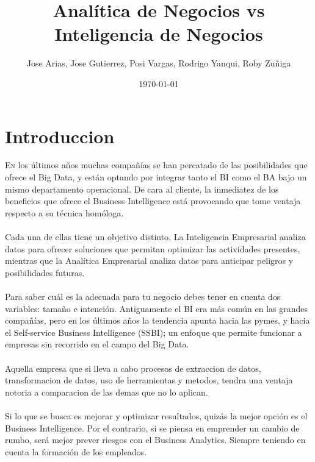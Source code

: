 \documentclass[twoside,twocolumn]{article}
\title{Analítica de Negocios vs Inteligencia de Negocios}
\author{Jose Arias, Jose Gutierrez, Posi Vargas, Rodrigo Yanqui, Roby Zuñiga}
\date{\today}
\begin{document}
\maketitle


\section{Introduccion}
\lettrine[nindent=0em,lines=3]{E}n los últimos años muchas compañías se han percatado de las posibilidades que ofrece el Big Data, y están optando por integrar tanto el BI como el BA bajo un mismo departamento operacional. De cara al cliente, la inmediatez de los beneficios que ofrece el Business Intelligence está provocando que tome ventaja respecto a su técnica homóloga.\\ \\
Cada una de ellas tiene un objetivo distinto. La Inteligencia Empresarial analiza datos para ofrecer soluciones que permitan optimizar las actividades presentes, mientras que la Analítica Empresarial analiza datos para anticipar peligros y posibilidades futuras.\\ \\
Para saber cuál es la adecuada para tu negocio debes tener en cuenta dos variables: tamaño e intención. Antiguamente el BI era más común en las grandes compañías, pero en los últimos años la tendencia apunta hacia las pymes, y hacia el Self-service Business Intelligence (SSBI); un enfoque que permite funcionar a empresas sin recorrido en el campo del Big Data. \\ \\
Aquella empresa que si lleva a cabo procesos de extraccion de datos, transformacion de datos, uso de herramientas y metodos, tendra una ventaja notoria a comparacion de las demas que no lo aplican.\\ \\
Si lo que se busca es mejorar y optimizar resultados, quizás la mejor opción es el Business Intelligence. Por el contrario, si se piensa en emprender un cambio de rumbo, será mejor prever riesgos con el Business Analytics. Siempre teniendo en cuenta la formación de los empleados.

\end{document}
